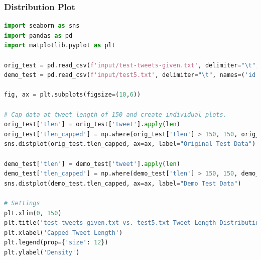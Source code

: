 \documentclass[runningheads]{llncs}
\begin{document}
\subsubsection{Distribution Plot}


\begin{lstlisting}[breaklines, language=Python]
import seaborn as sns
import pandas as pd
import matplotlib.pyplot as plt

orig_test = pd.read_csv(f'input/test-tweets-given.txt', delimiter="\t", names=('id','user','lang','tweet'))
demo_test = pd.read_csv(f'input/test5.txt', delimiter="\t", names=('id','user','lang','tweet'))

fig, ax = plt.subplots(figsize=(10,6))

# Cap data at tweet length of 150 and create individual plots.
orig_test['tlen'] = orig_test['tweet'].apply(len)
orig_test['tlen_capped'] = np.where(orig_test['tlen'] > 150, 150, orig_test['tlen'])
sns.distplot(orig_test.tlen_capped, ax=ax, label="Original Test Data")

demo_test['tlen'] = demo_test['tweet'].apply(len)
demo_test['tlen_capped'] = np.where(demo_test['tlen'] > 150, 150, demo_test['tlen'])
sns.distplot(demo_test.tlen_capped, ax=ax, label="Demo Test Data")

# Settings
plt.xlim(0, 150)
plt.title('test-tweets-given.txt vs. test5.txt Tweet Length Distribution')
plt.xlabel('Capped Tweet Length')
plt.legend(prop={'size': 12})
plt.ylabel('Density')
\end{lstlisting}
\end{document}
